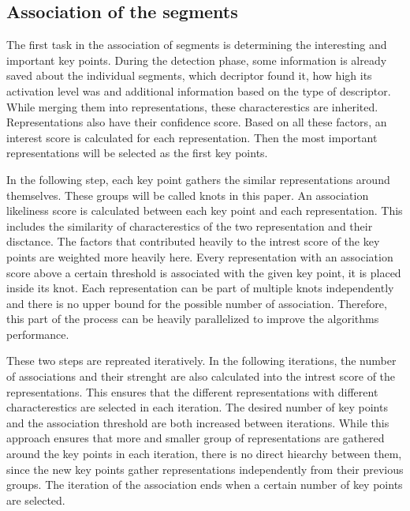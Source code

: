 \subsection{Association of the segments} %

The first task in the association of segments is determining the interesting and important key points. During the detection phase, some information is already saved about the individual segments, which decriptor found it, how high its activation level was and additional information based on the type of descriptor. While merging them into representations, these characterestics are inherited. Representations also have their confidence score. Based on all these factors, an interest score is calculated for each representation. Then the most important representations will be selected as the first key points.

In the following step, each key point gathers the similar representations around themselves. These groups will be called knots in this paper. An association likeliness score is calculated between each key point and each representation. This includes the similarity of characterestics of the two representation and their disctance. The factors that contributed heavily to the intrest score of the key points are weighted more heavily here. Every representation with an association score above a certain threshold is associated with the given key point, it is placed inside its knot. Each representation can be part of multiple knots independently and there is no upper bound for the possible number of association. Therefore, this part of the process can be heavily parallelized to improve the algorithms performance.

These two steps are repreated iteratively. In the following iterations, the number of associations and their strenght are also calculated into the intrest score of the representations. This ensures that the different representations with different characterestics are selected in each iteration. The desired number of key points and the association threshold are both increased between iterations. While this approach ensures that more and smaller group of representations are gathered around the key points in each iteration, there is no direct hiearchy between them, since the new key points gather representations independently from their previous groups. The iteration of the association ends when a certain number of key points are selected.

